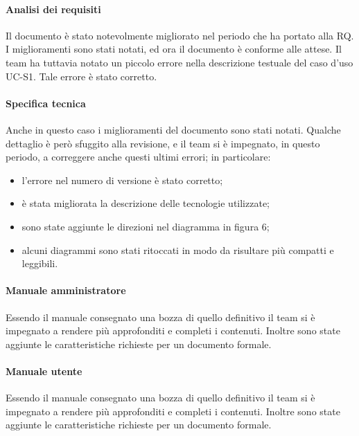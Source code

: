 \paragraph*{Analisi dei requisiti}
Il documento è stato notevolmente migliorato nel periodo che ha portato alla RQ. I miglioramenti sono stati notati, ed ora il documento è conforme alle attese. Il team ha tuttavia notato un piccolo errore nella descrizione testuale del caso d'uso UC-S1. Tale errore è stato corretto.

\paragraph*{Specifica tecnica}
Anche in questo caso i miglioramenti del documento sono stati notati. Qualche dettaglio è però sfuggito alla revisione, e il team si è impegnato, in questo periodo, a correggere anche questi ultimi errori; in particolare:
\begin{itemize}
\item l'errore nel numero di versione è stato corretto;
\item è stata migliorata la descrizione delle tecnologie utilizzate;
\item sono state aggiunte le direzioni nel diagramma in figura 6;
\item alcuni diagrammi sono stati ritoccati in modo da risultare più compatti e leggibili.
\end{itemize}

\paragraph*{Manuale amministratore}
Essendo il manuale consegnato una bozza di quello definitivo il team si è impegnato a rendere più approfonditi e completi i contenuti. Inoltre sono state aggiunte le caratteristiche richieste per un documento formale.

\paragraph*{Manuale utente}
Essendo il manuale consegnato una bozza di quello definitivo il team si è impegnato a rendere più approfonditi e completi i contenuti. Inoltre sono state aggiunte le caratteristiche richieste per un documento formale.

